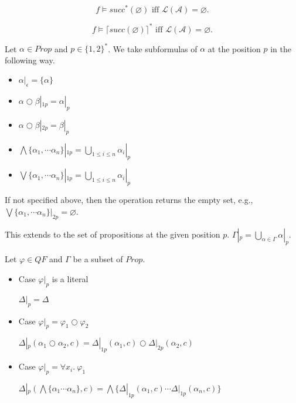 \begin{theorem}
[Emptiness] \[ f \models \mathit{succ}^*(\varnothing) \text{ iff }
\mathcal{L}(\mathcal{A}) = \varnothing. \]
\end{theorem}

\begin{theorem}
[Antichain] \[ f \models \lceil \mathit{succ}(\varnothing) \rceil^* \text{ iff }
\mathcal{L}(\mathcal{A}) = \varnothing. \]
\end{theorem}

\begin{definition}
Let \( \alpha \in \mathit{Prop} \) and \( p \in \{1, 2\}^* \). We take subformulas of \( \alpha \) at the position \( p \) in the following way.
\begin{itemize}
\item \( \alpha |_{ \epsilon } = \{ \alpha \}\)
\item \( \alpha \bigcirc \beta |_{ 1p } = \alpha |_{p} \)
\item \( \alpha \bigcirc \beta |_{ 2p } = \beta |_{p} \)
\item \( \bigwedge\{\alpha_1, \cdots \alpha_n \} |_{ 1p } = \bigcup\limits_{1 \leq i \leq n} \alpha_i |_{p} \)
\item \( \bigvee  \{\alpha_1, \cdots \alpha_n \} |_{ 1p } = \bigcup\limits_{1 \leq i \leq n} \alpha_i |_{p} \)
\end{itemize}
If not specified above, then the operation returns the empty set, e.g., \(
\bigvee \{\alpha_1, \cdots \alpha_n \} |_{ 2p } = \varnothing \).
\end{definition}
This extends to the set of propositions at the given position \( p \). \(\Gamma|_{p} = \bigcup\limits_{\alpha \in \Gamma}\alpha|_p \).

\begin{definition}
Let \( \varphi \in \mathit{QF} \) and \( \Gamma \) be a subset of \( \mathit{Prop} \).
\begin{itemize}
\item Case \( \varphi |_p \) is a literal

\( \Delta|_p = \Delta \)
\item Case \( \varphi |_p = \varphi_1 \bigcirc \varphi_2 \) 

\( \Delta|_p(\alpha_1 \bigcirc \alpha_2, c) = \Delta|_{1p}(\alpha_1, c) \bigcirc \Delta|_{2p}(\alpha_2, c) \)
\item Case \( \varphi |_p = \forall x_i .\ \varphi_1 \) 

\( \Delta|_p(\bigwedge\{\alpha_1 \cdots \alpha_n\}, c) = \bigwedge\{ \Delta|_{1p}(\alpha_1, c) \cdots \Delta|_{1p}(\alpha_n, c)\} \)
\end{itemize}
\end{definition}

